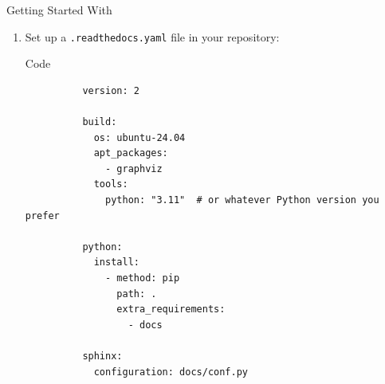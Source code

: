 \begin{frame}[fragile]{Getting Started With \rtd}
  \begin{enumerate}
    \item Set up a \texttt{.readthedocs.yaml} file in your repository:
      \begin{block}{Code}
        \begin{verbatim}
          version: 2

          build:
            os: ubuntu-24.04
            apt_packages:
              - graphviz
            tools:
              python: "3.11"  # or whatever Python version you prefer

          python:
            install:
              - method: pip
                path: .
                extra_requirements:
                  - docs

          sphinx:
            configuration: docs/conf.py
        \end{verbatim}
      \end{block}
  \end{enumerate}
\end{frame}

